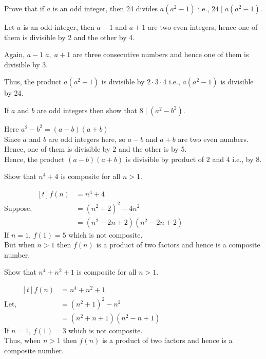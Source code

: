 \documentclass[12pt,class=book,crop=false]{standalone}
\begin{document}
\begin{qn}
    Prove that if $ a $ is an odd integer, then  24 divides $ a(a^2-1) $ i.e., $ 24\mid a(a^2-1) $.
\end{qn}
\begin{soln}
    Let $ a $ is an odd integer, then $ a-1  $ and $ a+1 $ are two even integers, hence one of them is divisible by 2 and the other by 4.

    Again, $ a-1\;a,\;a+1 $ are three consecutive numbers and hence one of them is divisible by 3.

    Thus, the product $ a(a^2-1) $ is divisible by $ 2\cdot3\cdot4 $ i.e., $ a(a^2-1) $ is divisible by 24.
\end{soln}
\begin{qn}
    If $ a $ and $ b $ are odd integers then show that $ 8\mid (a^2-b^2) $.
\end{qn}
\begin{soln}
    Here $ a^2-b^2=(a-b)(a+b) $\\
    Since $ a $ and $ b $ are odd integers here, so $ a-b $ and $ a+b $ are two even numbers. Hence, one of them is divisible by 2 and the other is by 5.\\
    Hence, the product $ (a-b)(a+b) $ is divisible by product of $ 2 $ and 4 i.e., by 8.
\end{soln}
\begin{qn}
    Show that $ n^4+4 $ is composite for all $ n>1 $.
\end{qn}
\begin{soln}
    Suppose, $ \begin{aligned}[t]
        f(n)&=n^4+4\\
        &=(n^2+2)^2-4n^2\\
        &=(n^2+2n+2)(n^2-2n+2)
    \end{aligned} $\\
    If $ n=1 $, $ f(1)=5 $ which is not composite.\\
    But when $ n>1 $ then $ f(n) $ is a product of two factors and hence is a composite number.
\end{soln}
\begin{qn}
    Show that $ n^4+n^2+1 $ is composite for all $ n>1 $.
\end{qn}
\begin{soln}
    Let, $ \begin{aligned}[t]
        f(n)&=n^4+n^2+1\\
        &=(n^2+1)^2-n^2\\
        &=(n^2+n+1)(n^2-n+1)
    \end{aligned} $\\
    If $ n=1 $, $ f(1)=3 $ which is not composite.\\
    Thus, when $ n>1 $ then $ f(n) $ is a product of two factors and hence is a composite number.
\end{soln}
\end{document}
